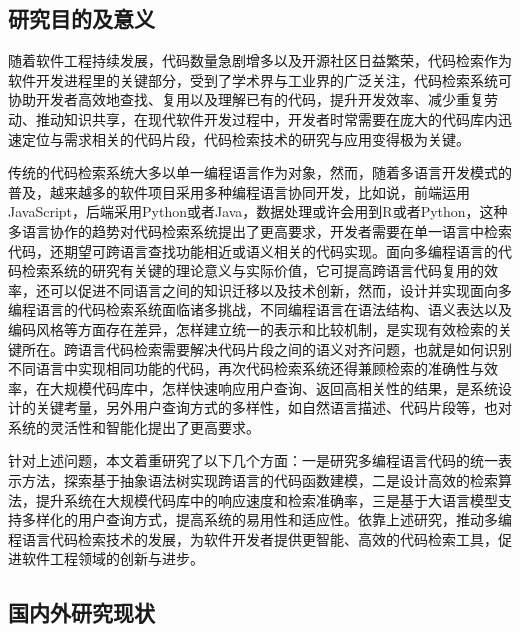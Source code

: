 \documentclass[UTF8,a4paper,12pt]{ctexart}
\numberwithin{equation}{section}
\begin{document}
\subsection{研究目的及意义}
随着软件工程持续发展，代码数量急剧增多以及开源社区日益繁荣，代码检索作为软件开发进程里的关键部分，受到了学术界与工业界的广泛关注，代码检索系统可协助开发者高效地查找、复用以及理解已有的代码，提升开发效率、减少重复劳动、推动知识共享，在现代软件开发过程中，开发者时常需要在庞大的代码库内迅速定位与需求相关的代码片段，代码检索技术的研究与应用变得极为关键。\par

传统的代码检索系统大多以单一编程语言作为对象，然而，随着多语言开发模式的普及，越来越多的软件项目采用多种编程语言协同开发，比如说，前端运用JavaScript，后端采用Python或者Java，数据处理或许会用到R或者Python，这种多语言协作的趋势对代码检索系统提出了更高要求，开发者需要在单一语言中检索代码，还期望可跨语言查找功能相近或语义相关的代码实现。面向多编程语言的代码检索系统的研究有关键的理论意义与实际价值，它可提高跨语言代码复用的效率，还可以促进不同语言之间的知识迁移以及技术创新，然而，设计并实现面向多编程语言的代码检索系统面临诸多挑战，不同编程语言在语法结构、语义表达以及编码风格等方面存在差异，怎样建立统一的表示和比较机制，是实现有效检索的关键所在。跨语言代码检索需要解决代码片段之间的语义对齐问题，也就是如何识别不同语言中实现相同功能的代码，再次代码检索系统还得兼顾检索的准确性与效率，在大规模代码库中，怎样快速响应用户查询、返回高相关性的结果，是系统设计的关键考量，另外用户查询方式的多样性，如自然语言描述、代码片段等，也对系统的灵活性和智能化提出了更高要求。\par

针对上述问题，本文着重研究了以下几个方面：一是研究多编程语言代码的统一表示方法，探索基于抽象语法树实现跨语言的代码函数建模，二是设计高效的检索算法，提升系统在大规模代码库中的响应速度和检索准确率，三是基于大语言模型支持多样化的用户查询方式，提高系统的易用性和适应性。依靠上述研究，推动多编程语言代码检索技术的发展，为软件开发者提供更智能、高效的代码检索工具，促进软件工程领域的创新与进步。\par

\subsection{国内外研究现状}
\end{document}
